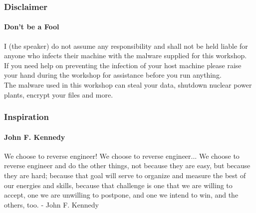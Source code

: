 \documentclass[aspectratio=169]{beamer}
\begin{document}
\begin{frame}
  \frametitle{Disclaimer}
  \framesubtitle{Don't be a Fool}
  \begin{tcolorbox}[title=disclaimer\_1.log,colback=gray]
    I (the speaker) do not assume any responsibility and shall not be held
    liable for anyone who infects their machine with the malware supplied for
    this workshop. \\
    \newline
    If you need help on preventing the infection of your host machine please
    raise your hand during the workshop for assistance before you run anything. \\
    \newline
    The malware used in this workshop can steal your data, shutdown nuclear
    power plants, encrypt your files and more. \\
  \end{tcolorbox}
\end{frame}

\begin{frame}
  \frametitle{Inspiration}
  \framesubtitle{John F. Kennedy}
  \begin{tcolorbox}[title=john\_f\_kennedy.log,colback=gray]
    We choose to reverse engineer! We choose to reverse
    engineer... We choose to reverse engineer and do the other things, not
    because they are easy, but because they are hard; because that goal will
    serve to organize and measure the best of our energies and skills, because
    that challenge is one that we are willing to accept, one we are unwilling to
    postpone, and one we intend to win, and the others, too. - John F. Kennedy \\
  \end{tcolorbox}
\end{frame}
\end{document}
